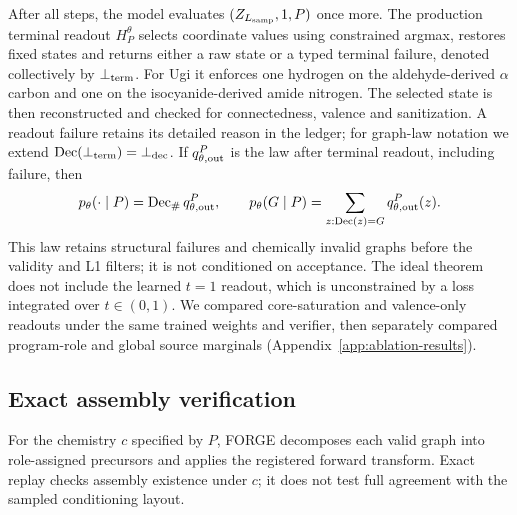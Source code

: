 \documentclass{article}
\theoremstyle{definition}
\begin{document}
After all steps, the model evaluates $(Z_{L_{\rm samp}},1,P)$ once more. The production terminal
readout $H_P^\theta$ selects coordinate values using constrained argmax, restores fixed states and
returns either a raw state or a typed terminal failure, denoted collectively by $\bot_{\rm term}$.
For Ugi it enforces one hydrogen on the aldehyde-derived $\alpha$ carbon and one on the
isocyanide-derived amide nitrogen. The selected state is then reconstructed and checked for
connectedness, valence and sanitization. A readout failure retains its detailed reason in the ledger;
for graph-law notation we extend $\operatorname{Dec}(\bot_{\rm term})=\bot_{\rm dec}$.
If $q_{\theta,\rm out}^P$ is the law after terminal readout, including failure, then
\begin{equation}
 p_\theta(\cdot\mid P)=\operatorname{Dec}_{\#}q_{\theta,\rm out}^P,
 \qquad
 p_\theta(G\mid P)=\sum_{z:\operatorname{Dec}(z)=G}q_{\theta,\rm out}^P(z).
 \label{eq:generated-law}
\end{equation}
This law retains structural failures and chemically invalid graphs before the validity and L1
filters; it is not conditioned on acceptance.
The ideal theorem does not include the learned $t=1$ readout, which is unconstrained by a loss
integrated over $t\in(0,1)$. We compared core-saturation and valence-only readouts under the same
trained weights and verifier, then separately compared program-role and global source marginals
(Appendix~\ref{app:ablation-results}).

\subsection{Exact assembly verification}
\label{app:verification}

For the chemistry $c$ specified by $P$, FORGE decomposes each valid graph into role-assigned
precursors and applies the registered forward transform. Exact replay checks assembly existence
under $c$; it does not test full agreement with the sampled conditioning layout.
\end{document}
